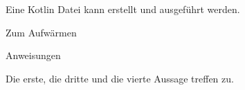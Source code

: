 \begin{solution}
    Eine Kotlin Datei kann erstellt und ausgeführt werden.
\end{solution}
\begin{task}[points=auto]{Zum Aufwärmen }
    \begin{subtask*}[points=0]{Anweisungen}
        \begin{itemize}
            \mchead
        \end{itemize}

        \begin{solution}
            Die erste, die dritte und die vierte Aussage treffen zu.
        \end{solution}
    \end{subtask*}
\end{task}
